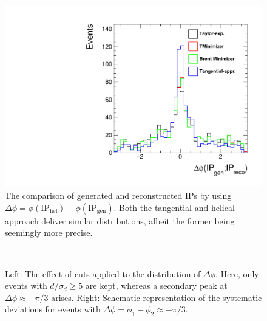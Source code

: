 \begin{figure}[h]
	\centering
	\includegraphics[width=0.7\linewidth]{Figures/deltaPhi_nocut}
	\caption{The comparison of generated and reconstructed IPs by using $\Delta\phi = \phi(\text{IP}_\text{hel})-\phi({\text{IP}_\text{gen}})$. Both the tangential and helical approach deliver similar distributions, albeit the former being seemingly more precise.}
	\label{fig:deltaphinocut}
\end{figure}\\
\begin{figure}[h!]
	\centering
	\caption{Left: The effect of cuts applied to the distribution of $\Delta\phi$. Here, only events with $d/\sigma_{d} \geq 5$ are kept, whereas a secondary peak at $\Delta\phi \approx -\pi/3$  arises. Right: Schematic representation of the systematic deviations for events with $\Delta\phi = \phi_1-\phi_2\approx -\pi/3$.}
	\label{fig:IP_gen_vs_IP_reco}
\end{figure}\\

